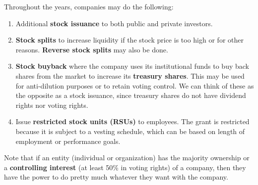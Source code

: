 \documentclass{article}
\begin{document}
    \begin{definition}
      Throughout the years, companies may do the following: 
      \begin{enumerate}
        \item Additional \textbf{stock issuance} to both public and private investors. 
        \item \textbf{Stock splits} to increase liquidity if the stock price is too high or for other reasons. \textbf{Reverse stock splits} may also be done.
        \item \textbf{Stock buyback} where the company uses its institutional funds to buy back shares from the market to increase its \textbf{treasury shares}. This may be used for anti-dilution purposes or to retain voting control. We can think of these as the opposite as a stock issuance, since treasury shares do not have dividend rights nor voting rights. 
        \item Issue \textbf{restricted stock units (RSUs)} to employees. The grant is restricted because it is subject to a vesting schedule, which can be based on length of employment or performance goals.
      \end{enumerate}
    \end{definition}

    Note that if an entity (individual or organization) has the majority ownership or a \textbf{controlling interest} (at least 50\% in voting rights) of a company, then they have the power to do pretty much whatever they want with the company. 
\end{document}
